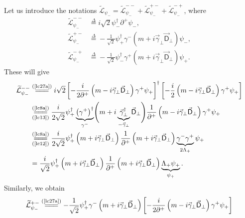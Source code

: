 \begin{note}\noindent 
Let us introduce the notations $\widetilde{\mathcal{L}}_{\psi_-}=\widetilde{\mathcal{L}}_{\psi_-}^{--}+\widetilde{\mathcal{L}}_{\psi_-}^{+-}+\widetilde{\mathcal{L}}_{\psi_-}^{-+}$, where
\begin{align*}
\widetilde{\mathcal{L}}_{\psi_-}^{--}&\overset{\Delta}{=}i\sqrt{2}\psi_-^\dag\partial^+\psi_-,\\
\widetilde{\mathcal{L}}_{\psi_-}^{+-}&\overset{\Delta}{=}-\frac{1}{\sqrt{2}}\psi_+^\dag\gamma^-\left(m+i\vec{\gamma}_\perp\vec{\textsf{D}}_\perp\right)\psi_-,\\
\widetilde{\mathcal{L}}_{\psi_-}^{-+}&\overset{\Delta}{=}-\frac{1}{\sqrt{2}}\psi_-^\dag\gamma^+\left(m+i\vec{\gamma}_\perp\vec{\textsf{D}}_\perp\right)\psi_+.
\end{align*}
These will give
\begin{align*}
\widetilde{\mathcal{L}}_{\psi_-}^{--}&\stackrel{(\text{\cref{lc27a}})}{=\joinrel=\joinrel=}i\sqrt{2}\left[-\frac{i}{2\partial^+}\left(m-i\vec{\gamma}_\perp\vec{\textsf{D}}_\perp\right)\gamma^+\psi_+\right]^\dag\left[-\frac{i}{2}\left(m-i\vec{\gamma}_\perp\vec{\textsf{D}}_\perp\right)\gamma^+\psi_+\right]\\
&\underset{(\text{\cref{lc13}})}{\stackrel{(\text{\cref{lc8a}})}{=\joinrel=\joinrel=}}\frac{i}{2\sqrt{2}}\psi_+^\dag\underbrace{\left(\gamma^+\right)^\dag}_{\gamma^-}\Biggl(m+i\underbrace{\vec{\gamma}_\perp^\dag}_{-\vec{\gamma}_\perp}\vec{\textsf{D}}_\perp\Biggr)\frac{1}{\partial^+}\left(m-i\vec{\gamma}_\perp\vec{\textsf{D}}_\perp\right)\gamma^+\psi_+\\
&\underset{(\text{\cref{lc12}})}{\stackrel{(\text{\cref{lc8a}})}{=\joinrel=\joinrel=}}\frac{i}{2\sqrt{2}}\psi_+^\dag\left(m+i\vec{\gamma}_\perp\vec{\textsf{D}}_\perp\right)\frac{1}{\partial^+}\left(m+i\vec{\gamma}_\perp\vec{\textsf{D}}_\perp\right)\underbrace{\gamma^-\gamma^+}_{2\Lambda_+}\psi_+\\
&=\frac{i}{\sqrt{2}}\psi_+^\dag\left(m+i\vec{\gamma}_\perp\vec{\textsf{D}}_\perp\right)\frac{1}{\partial^+}\left(m+i\vec{\gamma}_\perp\vec{\textsf{D}}_\perp\right)\underbrace{\Lambda_+\psi_+}_{\psi_+}.
\end{align*} 
Similarly, we obtain
\begin{align*}
\widetilde{\mathcal{L}}_{\psi_-}^{+-}&\stackrel{(\text{\cref{lc27a}})}{=\joinrel=\joinrel=}-\frac{1}{\sqrt{2}}\psi_+^\dag\gamma^-\left(m+i\vec{\gamma}_\perp\vec{\textsf{D}}_\perp\right)\left[-\frac{i}{2\partial^+}\left(m-i\vec{\gamma}_\perp\vec{\textsf{D}}_\perp\right)\gamma^+\psi_+\right]\\

\end{align*}
\end{note}
